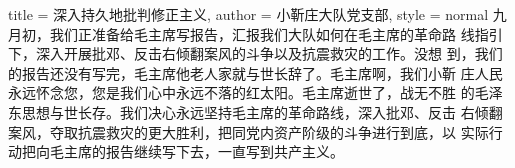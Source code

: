 \begin{hongqiarticle}{
        title  = {深入持久地批判修正主义},
        author = {小靳庄大队党支部},
        style  = normal
    }
    九月初，我们正准备给毛主席写报告，汇报我们大队如何在毛主席的革命路
    线指引下，深入开展批邓、反击右倾翻案风的斗争以及抗震救灾的工作。没想
    到，我们的报告还没有写完，毛主席他老人家就与世长辞了。毛主席啊，我们小靳
    庄人民永远怀念您，您是我们心中永远不落的红太阳。毛主席逝世了，战无不胜
    的毛泽东思想与世长存。我们决心永远坚持毛主席的革命路线，深入批邓、反击
    右倾翻案风，夺取抗震救灾的更大胜利，把同党内资产阶级的斗争进行到底，以
    实际行动把向毛主席的报告继续写下去，一直写到共产主义。
\end{hongqiarticle}